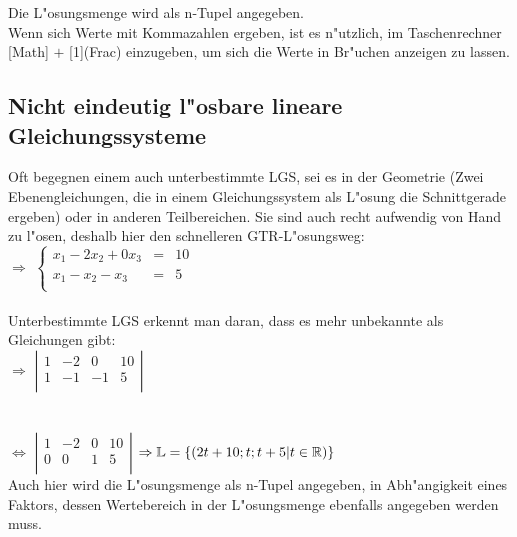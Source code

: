 \documentclass[main.tex]{subfiles}
\begin{document}
Die L"osungsmenge wird als n-Tupel angegeben.\\
Wenn sich Werte mit Kommazahlen ergeben, ist es n"utzlich, im Taschenrechner [Math] $+$ [1](Frac) einzugeben, um sich die Werte in Br"uchen anzeigen zu lassen.\\

	\subsection{Nicht eindeutig l"osbare lineare Gleichungssysteme}

Oft begegnen einem auch unterbestimmte LGS, sei es in der Geometrie (Zwei Ebenengleichungen, die in einem Gleichungssystem als L"osung die Schnittgerade ergeben) oder in anderen Teilbereichen. Sie sind auch recht aufwendig von Hand zu l"osen, deshalb hier den schnelleren GTR-L"osungsweg:\\

$\Rightarrow$ $\left\{ \begin{array}{rcl}
x_{1}-2x_{2}+0x_{3}&=&10\\
x_{1}-x_{2}-x_{3}& =& 5\\
\end{array}\right.$\\
\\
Unterbestimmte LGS erkennt man daran, dass es mehr unbekannte als Gleichungen gibt:\\

$\Rightarrow$ $\left\vert \begin{array}{rccl}
1&-2&0&10\\
1&-1&-1& 5 \\
\end{array}\right\vert$\\
\\
\\
$\Leftrightarrow$ $\left\vert \begin{array}{rccl}
1&-2&0&10\\
0&0&1&5 \\
\end{array}\right\vert$  \qquad $\Rightarrow \mathbb{L}=\{(2t+10;t;t+5|t\in\mathbb{R}) \}$ \\

Auch hier wird die L"osungsmenge als n-Tupel angegeben, in Abh"angigkeit eines Faktors, dessen Wertebereich in der L"osungsmenge ebenfalls angegeben werden muss.\\\\
\end{document}

